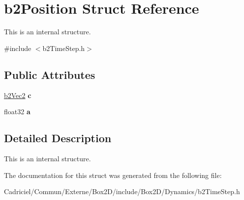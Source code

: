 \hypertarget{structb2_position}{}\section{b2\+Position Struct Reference}
\label{structb2_position}


This is an internal structure.  




{\ttfamily \#include $<$b2\+Time\+Step.\+h$>$}

\subsection*{Public Attributes}
\begin{DoxyCompactItemize}
\item 
\hyperlink{structb2_vec2}{b2\+Vec2} {\bfseries c}\hypertarget{structb2_position_a64b6d764d272385f84e4cac5ceb5af27}{}\label{structb2_position_a64b6d764d272385f84e4cac5ceb5af27}

\item 
float32 {\bfseries a}\hypertarget{structb2_position_a19d9362011e8c080059ac7f692cc7d8f}{}\label{structb2_position_a19d9362011e8c080059ac7f692cc7d8f}

\end{DoxyCompactItemize}


\subsection{Detailed Description}
This is an internal structure. 

The documentation for this struct was generated from the following file\+:\begin{DoxyCompactItemize}
\item 
Cadriciel/\+Commun/\+Externe/\+Box2\+D/include/\+Box2\+D/\+Dynamics/b2\+Time\+Step.\+h\end{DoxyCompactItemize}

